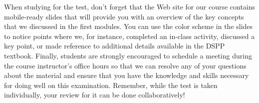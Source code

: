 When studying for the test, don't forget that the Web site for our course contains mobile-ready slides that will provide
you with an overview of the key concepts that we discussed in the first modules. You can use the color scheme in the
slides to notice points where we, for instance, completed an in-class activity, discussed a key point, or made reference
to additional details available in the DSPP textbook. Finally, students are strongly encouraged to schedule a meeting
during the course instructor's office hours so that we can resolve any of your questions about the material and ensure
that you have the knowledge and skills necessary for doing well on this examination. Remember, while the test is taken
individually, your review for it can be done collaboratively!


